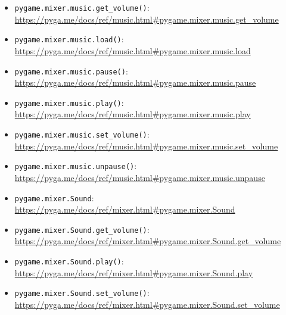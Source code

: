 \begin{itemize}
	\item \texttt{pygame.mixer.music.get\_volume()}:
\\ \url{https://pyga.me/docs/ref/music.html#pygame.mixer.music.get_volume}

    \item \texttt{pygame.mixer.music.load()}:
\\ \url{https://pyga.me/docs/ref/music.html#pygame.mixer.music.load}

	\item \texttt{pygame.mixer.music.pause()}:
\\ \url{https://pyga.me/docs/ref/music.html#pygame.mixer.music.pause}

	\item \texttt{pygame.mixer.music.play()}:
\\ \url{https://pyga.me/docs/ref/music.html#pygame.mixer.music.play}

	\item \texttt{pygame.mixer.music.set\_volume()}:
\\ \url{https://pyga.me/docs/ref/music.html#pygame.mixer.music.set_volume}

	\item \texttt{pygame.mixer.music.unpause()}:
\\ \url{https://pyga.me/docs/ref/music.html#pygame.mixer.music.unpause}

	\item \texttt{pygame.mixer.Sound}:
\\ \url{https://pyga.me/docs/ref/mixer.html#pygame.mixer.Sound}

	\item \texttt{pygame.mixer.Sound.get\_volume()}:
\\ \url{https://pyga.me/docs/ref/mixer.html#pygame.mixer.Sound.get_volume}

	\item \texttt{pygame.mixer.Sound.play()}:
\\ \url{https://pyga.me/docs/ref/mixer.html#pygame.mixer.Sound.play}

	\item \texttt{pygame.mixer.Sound.set\_volume()}:
\\ \url{https://pyga.me/docs/ref/mixer.html#pygame.mixer.Sound.set_volume}

\end{itemize}

